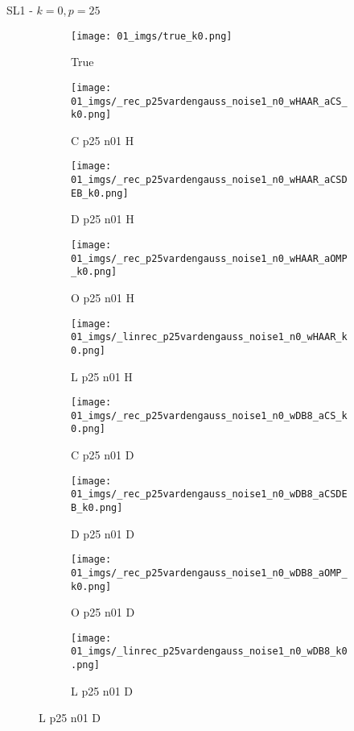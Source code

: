 \begin{frame}{SL1 - $k=0,p=25$}{}
\begin{figure}
\begin{subfigure}{0.1\textwidth}
\texttt{[image: 01\_imgs/true\_k0.png]}
\caption*{\Tiny True}
\end{subfigure}
\begin{subfigure}{0.1\textwidth}
\texttt{[image: 01\_imgs/\_rec\_p25vardengauss\_noise1\_n0\_wHAAR\_aCS\_k0.png]}
\caption*{\Tiny C p25 n01 H}
\end{subfigure}
\begin{subfigure}{0.1\textwidth}
\texttt{[image: 01\_imgs/\_rec\_p25vardengauss\_noise1\_n0\_wHAAR\_aCSDEB\_k0.png]}
\caption*{\Tiny D p25 n01 H}
\end{subfigure}
\begin{subfigure}{0.1\textwidth}
\texttt{[image: 01\_imgs/\_rec\_p25vardengauss\_noise1\_n0\_wHAAR\_aOMP\_k0.png]}
\caption*{\Tiny O p25 n01 H}
\end{subfigure}
\begin{subfigure}{0.1\textwidth}
\texttt{[image: 01\_imgs/\_linrec\_p25vardengauss\_noise1\_n0\_wHAAR\_k0.png]}
\caption*{\Tiny L p25 n01 H}
\end{subfigure}
\begin{subfigure}{0.1\textwidth}
\texttt{[image: 01\_imgs/\_rec\_p25vardengauss\_noise1\_n0\_wDB8\_aCS\_k0.png]}
\caption*{\Tiny C p25 n01 D}
\end{subfigure}
\begin{subfigure}{0.1\textwidth}
\texttt{[image: 01\_imgs/\_rec\_p25vardengauss\_noise1\_n0\_wDB8\_aCSDEB\_k0.png]}
\caption*{\Tiny D p25 n01 D}
\end{subfigure}
\begin{subfigure}{0.1\textwidth}
\texttt{[image: 01\_imgs/\_rec\_p25vardengauss\_noise1\_n0\_wDB8\_aOMP\_k0.png]}
\caption*{\Tiny O p25 n01 D}
\end{subfigure}
\begin{subfigure}{0.1\textwidth}
\texttt{[image: 01\_imgs/\_linrec\_p25vardengauss\_noise1\_n0\_wDB8\_k0.png]}
\caption*{\Tiny L p25 n01 D}
\end{subfigure}


\vspace{5pt}


\end{figure}
\end{frame}
